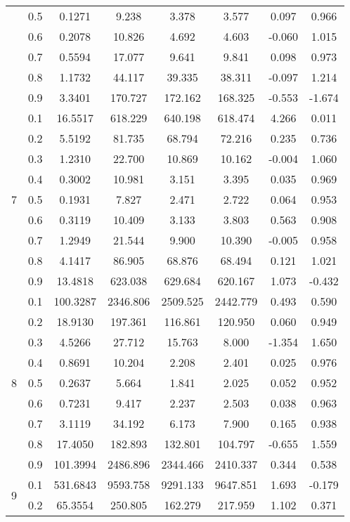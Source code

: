\documentclass[11pt,a4paper]{report}
\begin{document}
\begin{longtable}{ | c | c || c | c | c | c | c | c | }
 & 0.5 & 0.1271 & 9.238 & 3.378 & 3.577 & 0.097 & 0.966 \\
 & 0.6 & 0.2078 & 10.826 & 4.692 & 4.603 & -0.060 & 1.015 \\
 & 0.7 & 0.5594 & 17.077 & 9.641 & 9.841 & 0.098 & 0.973 \\
 & 0.8 & 1.1732 & 44.117 & 39.335 & 38.311 & -0.097 & 1.214 \\
 & 0.9 & 3.3401 & 170.727 & 172.162 & 168.325 & -0.553 & -1.674 \\
 \hline
\multirow{9}{*}{7} & 0.1 & 16.5517 & 618.229 & 640.198 & 618.474 & 4.266 & 0.011 \\
 & 0.2 & 5.5192 & 81.735 & 68.794 & 72.216 & 0.235 & 0.736 \\
 & 0.3 & 1.2310 & 22.700 & 10.869 & 10.162 & -0.004 & 1.060 \\
 & 0.4 & 0.3002 & 10.981 & 3.151 & 3.395 & 0.035 & 0.969 \\
 & 0.5 & 0.1931 & 7.827 & 2.471 & 2.722 & 0.064 & 0.953 \\
 & 0.6 & 0.3119 & 10.409 & 3.133 & 3.803 & 0.563 & 0.908 \\
 & 0.7 & 1.2949 & 21.544 & 9.900 & 10.390 & -0.005 & 0.958 \\
 & 0.8 & 4.1417 & 86.905 & 68.876 & 68.494 & 0.121 & 1.021 \\
 & 0.9 & 13.4818 & 623.038 & 629.684 & 620.167 & 1.073 & -0.432 \\
 \hline
\multirow{9}{*}{8} & 0.1 & 100.3287 & 2346.806 & 2509.525 & 2442.779 & 0.493 & 0.590 \\
 & 0.2 & 18.9130 & 197.361 & 116.861 & 120.950 & 0.060 & 0.949 \\
 & 0.3 & 4.5266 & 27.712 & 15.763 & 8.000 & -1.354 & 1.650 \\
 & 0.4 & 0.8691 & 10.204 & 2.208 & 2.401 & 0.025 & 0.976 \\
 & 0.5 & 0.2637 & 5.664 & 1.841 & 2.025 & 0.052 & 0.952 \\
 & 0.6 & 0.7231 & 9.417 & 2.237 & 2.503 & 0.038 & 0.963 \\
 & 0.7 & 3.1119 & 34.192 & 6.173 & 7.900 & 0.165 & 0.938 \\
 & 0.8 & 17.4050 & 182.893 & 132.801 & 104.797 & -0.655 & 1.559 \\
 & 0.9 & 101.3994 & 2486.896 & 2344.466 & 2410.337 & 0.344 & 0.538 \\
 \hline
\multirow{9}{*}{9} & 0.1 & 531.6843 & 9593.758 & 9291.133 & 9647.851 & 1.693 & -0.179 \\
 & 0.2 & 65.3554 & 250.805 & 162.279 & 217.959 & 1.102 & 0.371 \\

\end{longtable}
\end{document}
